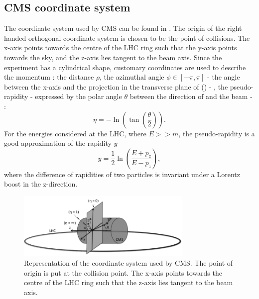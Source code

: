 \subsection{CMS coordinate system}
The coordinate system used by CMS can be found in . The origin of the right handed orthogonal coordinate system is chosen to be the point of collisions. The x-axis points towards the centre of the LHC ring such that the y-axis points towards the sky, and the z-axis lies tangent to the beam axis. Since the experiment has a cylindrical shape, customary coordinates are used to describe the momentum \impuls: the distance $\rho$, the azimuthal angle $\phi \in \left[-\pi,\pi\right]$ - the angle between the x-axis and the projection in the transverse plane of \impuls (\trimpuls) - , the pseudo-rapidity \psrap - expressed by the polar angle $\theta$ between the direction of \impuls and the beam - : 
\begin{equation}
\eta = - \ln \left(\tan \left(\frac{\theta}{2}\right)\right).
\end{equation}
For the energies considered at the LHC, where $E >> m$, the pseudo-rapidity is a good approximation of the rapidity $y$
\begin{equation}
y = \frac{1}{2} \ln \left(\frac{E + p_z}{E - p_z}\right), 
\end{equation}
where the difference of rapidities of two particles is invariant under a Lorentz boost in the z-direction.
 \begin{figure}[htbp]
	\centering
	\includegraphics[width=0.75\textwidth]{2_ExperimentalSetup/Figures/imageedit_1_9146672677}
	\caption{Representation of the coordinate system used by CMS. The point of origin is put at the collision point. The x-axis points towards the centre of the LHC ring such that the z-axis lies tangent to the beam axis. }
	\label{fig:CMScoord}
\end{figure}

